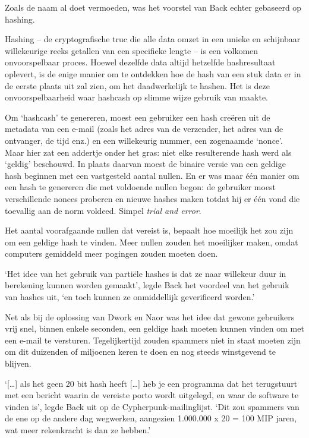 \documentclass[smalldemyvopaper,11pt,twoside,onecolumn,openright,extrafontsizes,hidelinks]{memoir}
\begin{document}
Zoals de naam al doet vermoeden, was het voorstel van Back echter
gebaseerd op hashing.

Hashing -- de cryptografische truc die alle data omzet in een unieke en
schijnbaar willekeurige reeks getallen van een specifieke lengte -- is
een volkomen onvoorspelbaar proces. Hoewel dezelfde data altijd
hetzelfde hashresultaat oplevert, is de enige manier om te ontdekken hoe
de hash van een stuk data er in de eerste plaats uit zal zien, om het
daadwerkelijk te hashen. Het is deze onvoorspelbaarheid waar hashcash op
slimme wijze gebruik van maakte.

Om `hashcash' te genereren, moest een gebruiker een hash creëren uit de
metadata van een e-mail (zoals het adres van de verzender, het adres van
de ontvanger, de tijd enz.) en een willekeurig nummer, een zogenaamde
`nonce'. Maar hier zat een addertje onder het gras: niet elke
resulterende hash werd als `geldig' beschouwd. In plaats daarvan moest
de binaire versie van een geldige hash beginnen met een vastgesteld
aantal nullen. En er was maar één manier om een hash te genereren die
met voldoende nullen begon: de gebruiker moest verschillende nonces
proberen en nieuwe hashes maken totdat hij er één vond die toevallig aan
de norm voldeed. Simpel \emph{trial and error}.

Het aantal voorafgaande nullen dat vereist is, bepaalt hoe moeilijk het
zou zijn om een geldige hash te vinden. Meer nullen zouden het
moeilijker maken, omdat computers gemiddeld meer pogingen zouden moeten
doen.

`Het idee van het gebruik van partiële hashes is dat ze naar willekeur
duur in berekening kunnen worden gemaakt', legde Back het voordeel van
het gebruik van hashes uit, `en toch kunnen ze onmiddellijk geverifieerd
worden.'

Net als bij de oplossing van Dwork en Naor was het idee dat gewone
gebruikers vrij snel, binnen enkele seconden, een geldige hash moeten
kunnen vinden om met een e-mail te versturen. Tegelijkertijd zouden
spammers niet in staat moeten zijn om dit duizenden of miljoenen keren
te doen en nog steeds winstgevend te blijven.

`{[}\ldots{]} als het geen 20 bit hash heeft {[}\ldots{]} heb je een
programma dat het terugstuurt met een bericht waarin de vereiste porto
wordt uitgelegd, en waar de software te vinden is', legde Back uit op de
Cypherpunk-mailinglijst. `Dit zou spammers van de ene op de andere dag
wegwerken, aangezien 1.000.000 x 20 = 100 MIP jaren, wat meer
rekenkracht is dan ze hebben.'
\end{document}
